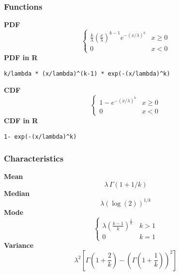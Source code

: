 \subsubsection*{Functions}

\smallskip \noindent \hspace{.2cm} \textbf{PDF} 
\begin{equation*}\begin{cases}
\frac{k}{\lambda}\left(\frac{x}{\lambda}\right)^{k-1}e^{-(x/\lambda)^{k}} & x\geq0\\
0 & x<0\end{cases}\end{equation*}
\smallskip \noindent \hspace{.2cm} \textbf{PDF in R}  
\begin{verbatim}k/lambda * (x/lambda)^(k-1) * exp(-(x/lambda)^k)\end{verbatim}
\smallskip \noindent \hspace{.2cm} \textbf{CDF} 
\begin{equation*}\begin{cases}1- e^{-(x/\lambda)^k} & x\geq0\\ 0 & x<0\end{cases}\end{equation*}
\smallskip \noindent \hspace{.2cm} \textbf{CDF in R} 
\begin{verbatim}1- exp(-(x/lambda)^k)\end{verbatim}
\smallskip
\subsubsection*{Characteristics}
\smallskip \noindent \hspace{.2cm} \textbf{Mean} 
\begin{equation*}\lambda \, \Gamma(1+1/k)\end{equation*}
\smallskip \noindent \hspace{.2cm} \textbf{Median} 
\begin{equation*}\lambda(\log(2))^{1/k}\end{equation*}
\smallskip \noindent \hspace{.2cm} \textbf{Mode} 
\begin{equation*}\begin{cases}
\lambda \left(\frac{k-1}{k} \right)^{\frac{1}{k}}\, &k>1\\
0 &k=1\end{cases}\end{equation*}
\smallskip \noindent \hspace{.2cm} \textbf{Variance} 
\begin{equation*}\lambda^2\left[\Gamma\left(1+\frac{2}{k}\right) - \left(\Gamma\left(1+\frac{1}{k}\right)\right)^2\right]\end{equation*}
\smallskip
